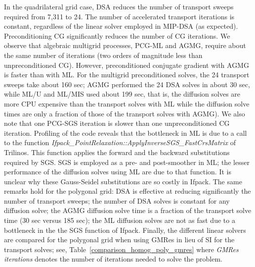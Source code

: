 \documentclass[preprint,10pt]{elsarticle}
\renewcommand{\(}{\left(}
\renewcommand{\)}{\right)}
\renewcommand{\[}{\left[}
\renewcommand{\]}{\right]}
\begin{document}
In the quadrilateral grid case, DSA reduces the number of transport sweeps required from 7,311 to 24.
The number of accelerated transport iterations is constant, regardless of the linear solver
employed in MIP-DSA (as expected). Preconditioning CG significantly reduces the number of CG iterations.
%
We observe that algebraic multigrid processes, PCG-ML and AGMG, require 
about the same number of iterations (two orders of magnitude less than unpreconditioned CG). 
However, preconditioned conjugate gradient with AGMG is faster than with ML. For the multigrid preconditioned solves,
the 24 transport sweeps take about 160 sec; AGMG performed the 24 DSA solves in about 30 sec,
while ML/U and ML/MIS used about 199 sec, that is, the diffusion solves are more CPU expensive than the
transport solves with ML while the diffusion solve times are only a fraction of those of the transport solves with AGMG). 
We also note that one PCG-SGS iteration is slower than one unpreconditioned CG iteration. Profiling of the code reveals that the bottleneck in ML is due to a call to the function \emph{Ifpack\_PointRelaxation::ApplyInverseSGS\_FastCrsMatrix} 
of Trilinos. This function applies the forward and the backward substitutions required by SGS.
SGS is employed as a pre- and post-smoother in ML; the lesser performance of the 
diffusion solves using ML are due to that function. 
It is unclear why these Gauss-Seidel substitutions are so costly in Ifpack. 
%
The same remarks hold for the polygonal grid: DSA is effective at reducing significantly the number of transport sweeps; the number of DSA solves is constant for any diffusion solve; the AGMG diffusion solve time is a fraction
of the transport solve time (30 sec versus 185 sec); the ML diffusion solves are not as fast due to a bottleneck in the the SGS function of Ifpack.
%
Finally, the different linear solvers are compared for the polygonal grid
when using GMRes in lieu of SI for the transport solves; see, 
Table~\ref{comparison_homog_poly_gmres} where {\it GMRes iterations} denotes
the number of iterations needed to solve the problem. 
\end{document}
